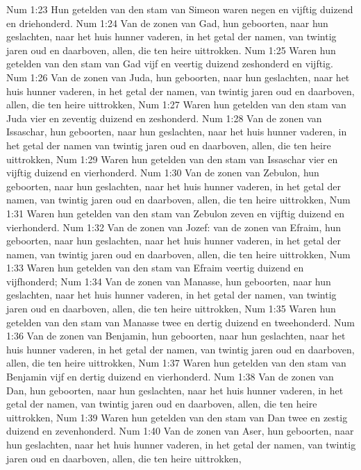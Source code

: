 Num 1:23  Hun getelden van den stam van Simeon waren negen en vijftig duizend en driehonderd.
Num 1:24  Van de zonen van Gad, hun geboorten, naar hun geslachten, naar het huis hunner vaderen, in het getal der namen, van twintig jaren oud en daarboven, allen, die ten heire uittrokken.
Num 1:25  Waren hun getelden van den stam van Gad vijf en veertig duizend zeshonderd en vijftig.
Num 1:26  Van de zonen van Juda, hun geboorten, naar hun geslachten, naar het huis hunner vaderen, in het getal der namen, van twintig jaren oud en daarboven, allen, die ten heire uittrokken,
Num 1:27  Waren hun getelden van den stam van Juda vier en zeventig duizend en zeshonderd.
Num 1:28  Van de zonen van Issaschar, hun geboorten, naar hun geslachten, naar het huis hunner vaderen, in het getal der namen van twintig jaren oud en daarboven, allen, die ten heire uittrokken,
Num 1:29  Waren hun getelden van den stam van Issaschar vier en vijftig duizend en vierhonderd.
Num 1:30  Van de zonen van Zebulon, hun geboorten, naar hun geslachten, naar het huis hunner vaderen, in het getal der namen, van twintig jaren oud en daarboven, allen, die ten heire uittrokken,
Num 1:31  Waren hun getelden van den stam van Zebulon zeven en vijftig duizend en vierhonderd.
Num 1:32  Van de zonen van Jozef: van de zonen van Efraim, hun geboorten, naar hun geslachten, naar het huis hunner vaderen, in het getal der namen, van twintig jaren oud en daarboven, allen, die ten heire uittrokken,
Num 1:33  Waren hun getelden van den stam van Efraim veertig duizend en vijfhonderd;
Num 1:34  Van de zonen van Manasse, hun geboorten, naar hun geslachten, naar het huis hunner vaderen, in het getal der namen, van twintig jaren oud en daarboven, allen, die ten heire uittrokken,
Num 1:35  Waren hun getelden van den stam van Manasse twee en dertig duizend en tweehonderd.
Num 1:36  Van de zonen van Benjamin, hun geboorten, naar hun geslachten, naar het huis hunner vaderen, in het getal der namen, van twintig jaren oud en daarboven, allen, die ten heire uittrokken,
Num 1:37  Waren hun getelden van den stam van Benjamin vijf en dertig duizend en vierhonderd.
Num 1:38  Van de zonen van Dan, hun geboorten, naar hun geslachten, naar het huis hunner vaderen, in het getal der namen, van twintig jaren oud en daarboven, allen, die ten heire uittrokken,
Num 1:39  Waren hun getelden van den stam van Dan twee en zestig duizend en zevenhonderd.
Num 1:40  Van de zonen van Aser, hun geboorten, naar hun geslachten, naar het huis hunner vaderen, in het getal der namen, van twintig jaren oud en daarboven, allen, die ten heire uittrokken,
